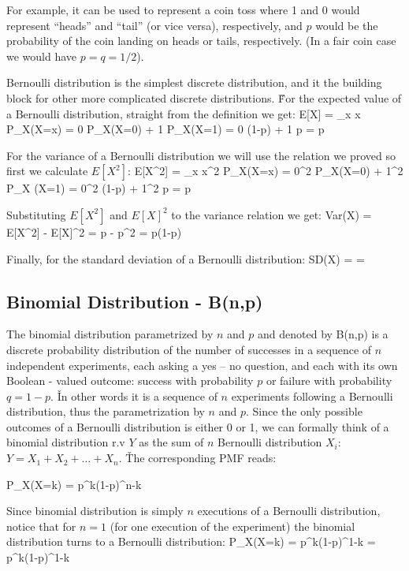 \be
For example, it can be used to represent a coin toss where 1 and 0 would represent ``heads'' and ``tail'' (or
vice versa), respectively, and $p$ would be the probability of the coin landing on heads or tails, respectively. (In
a fair coin case we would have $p=q=1/2$).
\ee

Bernoulli distribution is the simplest discrete distribution, and it the building block for other more complicated
discrete distributions. \v

For the expected value of a Bernoulli distribution, straight from the definition we get:
\bse
E[X] = \sum _{x} x P_{X}(X=x) = 0 \cdot P_{X}(X=0) + 1 \cdot P_{X}(X=1) = 0 \cdot (1-p) + 1 \cdot p = p
\ese

For the variance of a Bernoulli distribution we will use the relation we proved so first we calculate $E[X^2]$:
\bse
E[X^2] = \sum _{x} x^2 P_{X}(X=x) = 0^2 \cdot P_{X}(X=0) + 1^2 \cdot P_{X} (X=1) = 0^2 \cdot (1-p) + 1^2 \cdot p = p
\ese

Substituting $E[X^2]$ and $E[X]^2$ to the variance relation we get:
\bse
Var(X) = E[X^{2}] - E[X]^{2} = p - p^2 = p(1-p)
\ese

Finally, for the standard deviation of a Bernoulli distribution:
\bse
SD(X) =  = 
\ese

\subsection{Binomial Distribution - B(n,p)}

The binomial distribution parametrized by $n$ and $p$ and denoted by B(n,p) is a discrete probability distribution of
the number of successes in a sequence of $n$ independent experiments, each asking a yes – no question, and each with
its own Boolean - valued outcome: success with probability $p$ or failure with probability $q=1-p$. \v

In other words it is a sequence of $n$ experiments following a Bernoulli distribution, thus the parametrization by
$n$ and $p$. Since the only possible outcomes of a Bernoulli distribution is either 0 or 1, we can formally think of
a binomial distribution r.v $Y$ as the sum of $n$ Bernoulli distribution $X_{i}$: $Y=X_{1} + X_{2} + \ldots + X_{n}$. \v

The corresponding PMF reads:

\bse
P_{X}(X=k) = p^{k}(1-p)^{n-k}
\ese
\ed

Since binomial distribution is simply $n$ executions of a Bernoulli distribution, notice that for $n=1$ (for one
execution of the experiment) the binomial distribution turns to a Bernoulli distribution:
\bse
P_{X}(X=k) = p^{k}(1-p)^{1-k} = p^{k}(1-p)^{1-k}
\ese

